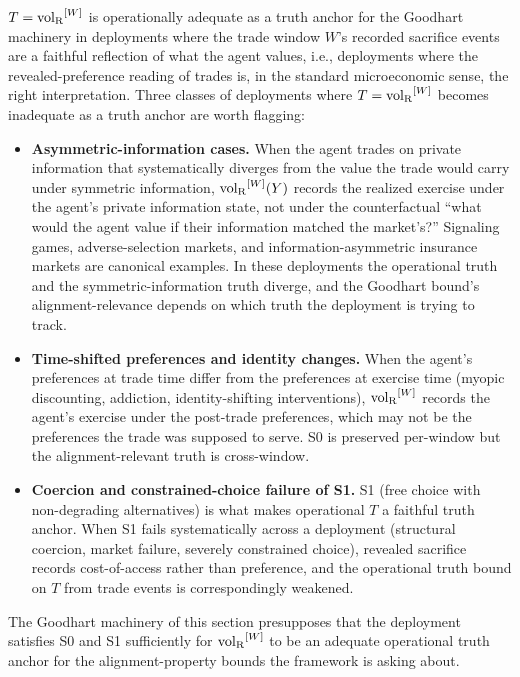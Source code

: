 \begin{remark}
\label{rem:T_failure_modes}
$T = {\operatorname{vol}_{\mathrm{R}}}^{[W]}$ is operationally adequate as a truth anchor for
the Goodhart machinery in deployments where the trade window
$W$'s recorded sacrifice events are a faithful reflection of
what the agent values, i.e., deployments where the
revealed-preference reading of trades is, in the standard
microeconomic sense, the right interpretation.  Three classes of
deployments where $T = {\operatorname{vol}_{\mathrm{R}}}^{[W]}$ becomes inadequate as a truth
anchor are worth flagging:
\begin{itemize}
\item \textbf{Asymmetric-information cases.}  When the agent
  trades on private information that systematically diverges
  from the value the trade would carry under symmetric
  information, ${\operatorname{vol}_{\mathrm{R}}}^{[W]}(Y)$ records the realized exercise
  under the agent's private information state, not under the
  counterfactual ``what would the agent value if their
  information matched the market's?''  Signaling games,
  adverse-selection markets, and information-asymmetric
  insurance markets are canonical examples.  In these
  deployments the operational truth and the
  symmetric-information truth diverge, and the Goodhart bound's
  alignment-relevance depends on which truth the deployment is
  trying to track.
\item \textbf{Time-shifted preferences and identity changes.}
  When the agent's preferences at trade time differ from the
  preferences at exercise time (myopic discounting, addiction,
  identity-shifting interventions), ${\operatorname{vol}_{\mathrm{R}}}^{[W]}$ records the
  agent's exercise under the post-trade preferences, which may
  not be the preferences the trade was supposed to serve.  S0
  is preserved per-window but the alignment-relevant truth is
  cross-window.
\item \textbf{Coercion and constrained-choice failure of S1.}
  S1 (free choice with non-degrading alternatives) is what
  makes operational $T$ a faithful truth anchor.  When S1
  fails systematically across a deployment (structural
  coercion, market failure, severely constrained choice),
  revealed sacrifice records cost-of-access rather
  than preference, and the operational truth bound on $T$ from
  trade events is correspondingly weakened.
\end{itemize}
The Goodhart machinery of this section presupposes that the
deployment satisfies S0 and S1 sufficiently for ${\operatorname{vol}_{\mathrm{R}}}^{[W]}$ to
be an adequate operational truth anchor for the
alignment-property bounds the framework is asking about.

\end{remark}
